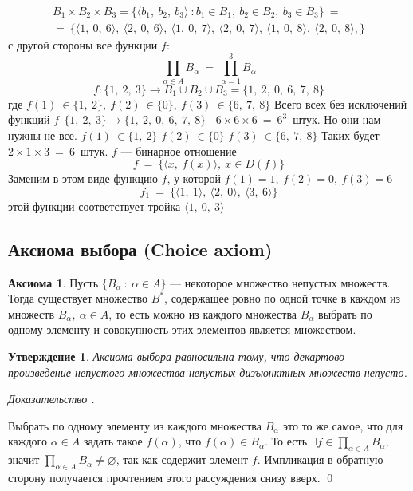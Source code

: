 \documentclass[12pt,oneside]{article}
\newtheorem{statement}{Утверждение}[section]
\theoremstyle{definition}
\newtheorem{axiom}{Аксиома}[section]
\newenvironment{ourproof}[1]{\textit{Доказательство #1.}}{\qed}
\begin{document}
\begin{eqnarray}
B_1\times B_2\times B_3 = \{\langle b_1,\ b_2,\ b_3\rangle\ : b_1 \in B_1,\ b_2\in B_2,\ b_3\in B_3\}\ = \nonumber \\ =\ \{
\langle 1,\ 0,\ 6\rangle,\ \langle 2,\ 0,\ 6\rangle,\ 
\langle 1,\ 0,\ 7\rangle,\ \langle 2,\ 0,\ 7\rangle,\ 
\langle 1,\ 0,\ 8\rangle,\ \langle 2,\ 0,\ 8\rangle,\} \nonumber
\end{eqnarray}
с другой стороны все функции $f$:
$$\displaystyle\prod_{\alpha \in A} B_{\alpha}\ =\ \displaystyle\prod_{\alpha = 1}^{3} B_{\alpha}$$
$$f: \{1,\ 2,\ 3\} \longrightarrow B_1\cup B_2\cup B_3 = \{1,\ 2,\ 0,\ 6,\ 7,\ 8\}$$
где $f(1)\ \in \{1,\ 2\},\ f(2)\ \in \{0\},\ f(3)\ \in \{6,\ 7,\ 8\}$ \newline
Всего всех без исключений функций $f\:\ \{1,\ 2,\ 3\} \longrightarrow \{1,\ 2,\ 0,\ 6,\ 7,\ 8\}\ \ \ \ 6\times 6\times 6\ =\ 6^3$\ штук. Но они нам нужны не все.
\newline
$f(1)\ \in \{1,\ 2\}$
\newline
$f(2)\ \in \{0\}$
\newline
$f(3)\ \in \{6,\ 7,\ 8\}$
\newline
Таких будет $2\times 1\times 3\ =\ 6$\ штук.
$f$ --- бинарное отношение
$$f\ =\ \{\langle x,\ f(x)\rangle ,\ x\in D(f)\}$$
Заменим в этом виде функцию $f$, у которой $f(1)=1,\ f(2)=0,\ f(3)=6\ $
$$f_1\ =\ \{\langle 1,\ 1\rangle ,\ \langle 2,\ 0\rangle ,\ \langle 3,\ 6\rangle\}$$
этой функции соответствует тройка $\langle 1,\ 0,\ 3\rangle$

\subsection{Аксиома выбора (Choice axiom)}
\begin{axiom}\label{choice}
Пусть $\{B_{\alpha}\ :\ \alpha \in A\}$ --- некоторое множество непустых множеств. Тогда существует множество $B^*$, содержащее ровно по одной точке в каждом из множеств $B_{\alpha},\ \alpha\in A$, то есть можно из каждого множества $B_{\alpha}$ выбрать по одному элементу и совокупность этих элементов является множеством.
\end{axiom}

\begin{statement}{} \label{choice_th}
Аксиома выбора равносильна тому, что декартово произведение непустого множества непустых дизъюнктных множеств непусто.
\end{statement}
\begin{ourproof}{}

Выбрать по одному элементу из каждого множества $B_{\alpha}$ это то же самое, что для каждого $\alpha\in A$ задать такое $f(\alpha)$, что $f(\alpha)\in B_{\alpha}$. 
То есть $\exists f\in \displaystyle\prod_{\alpha \in A} B_{\alpha}$, значит $\displaystyle\prod_{\alpha \in A} B_{\alpha} \neq \varnothing$, так как содержит элемент $f$. Импликация в обратную сторону получается прочтением этого рассуждения снизу вверх.
\end{ourproof}
\end{document}

